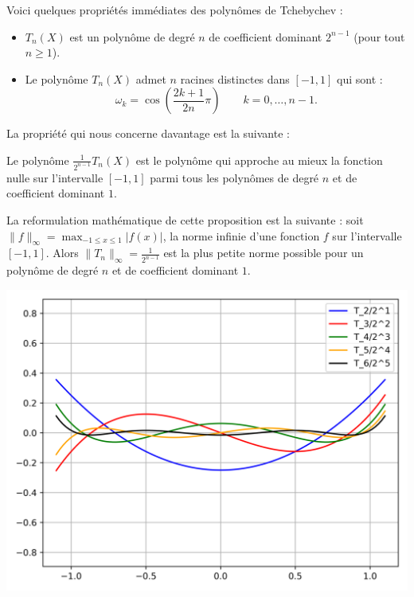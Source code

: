 \documentclass[11pt,class=report,crop=false]{standalone}
\begin{document}
Voici quelques propriétés immédiates des polynômes de Tchebychev :
\begin{proposition}
\sauteligne
\begin{itemize}
  \item $T_n(X)$ est un polynôme de degré $n$ de coefficient dominant $2^{n-1}$ (pour tout $n\ge1$).
  \item Le polynôme $T_n(X)$ admet $n$ racines distinctes dans $[-1,1]$ qui sont :
  $$\omega_k = \cos \left(\frac{2k+1}{2n}\pi\right) \qquad k=0,\ldots,n-1.$$
\end{itemize}
\end{proposition}

La propriété qui nous concerne davantage est la suivante :
\begin{proposition}
Le polynôme $\frac{1}{2^{n-1}} T_n(X)$ est le polynôme qui approche au mieux la fonction nulle sur l'intervalle $[-1,1]$ parmi 
tous les polynômes de degré $n$ et de coefficient dominant $1$.
\end{proposition}

La reformulation mathématique de cette proposition est la suivante :
soit $\|f \|_{\infty} = \max_{-1\le x \le 1} |f(x)|$, la norme infinie d'une fonction $f$ sur l'intervalle $[-1,1]$.
Alors $\| T_n \|_{\infty}  = \frac{1}{2^{n-1}}$ est la plus petite norme possible pour un polynôme de degré $n$ et de coefficient dominant $1$.

\begin{center}
  \includegraphics[scale=\myscale,scale=0.6]{figures/approx-tchebychev-02}
\end{center}
\end{document}
